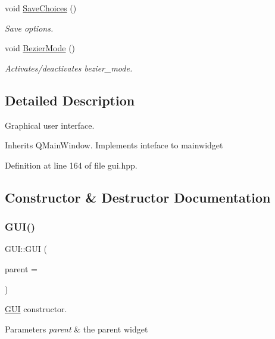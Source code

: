 \begin{DoxyCompactItemize}
void \mbox{\hyperlink{classGUI_a00fb847ea0a8249acaaf70c0f3ba3fd4}{Save\+Choices}} ()
\begin{DoxyCompactList}\small\item\em Save options. \end{DoxyCompactList}\item 
\mbox{\label{classGUI_ac0cb178a0a36573f7d99a104dd84f5ed}} 
void \mbox{\hyperlink{classGUI_ac0cb178a0a36573f7d99a104dd84f5ed}{Bezier\+Mode}} ()
\begin{DoxyCompactList}\small\item\em Activates/deactivates bezier\+\_\+mode. \end{DoxyCompactList}\end{DoxyCompactItemize}


\subsection{Detailed Description}
Graphical user interface. 

Inherits Q\+Main\+Window. Implements inteface to mainwidget 

Definition at line 164 of file gui.\+hpp.



\subsection{Constructor \& Destructor Documentation}
\mbox{\label{classGUI_acb0ba8c6fc121d814d30560e2c29f2fe}} 
\subsubsection{\texorpdfstring{G\+U\+I()}{GUI()}}
{\footnotesize\ttfamily G\+U\+I\+::\+G\+UI (\begin{DoxyParamCaption}\item[{Q\+Widget $\ast$}]{parent = {} }\end{DoxyParamCaption})}



\mbox{\hyperlink{classGUI}{G\+UI}} constructor. 


\begin{DoxyParams}{Parameters}
{\em parent} & the parent widget \\
\hline
\end{DoxyParams}


